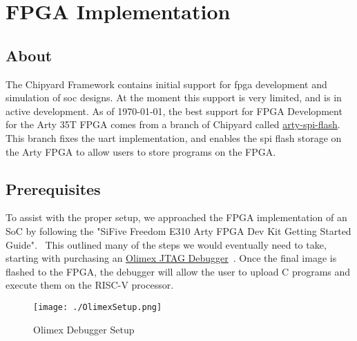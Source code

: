 \chapter{FPGA Implementation}\label{chap:FPGA_Implementation}

\section{About}\label{sec:About}
The Chipyard Framework contains initial support for \gls{fpga} development and simulation of \gls{soc} designs.
At the moment this support is very limited, and is in active development.
As of \today, the best support for FPGA Development for the Arty 35T FPGA comes from a branch of Chipyard called \href{https://github.com/ucb-bar/chipyard/tree/arty-spi-flash}{arty-spi-flash}.
This branch fixes the \gls{uart} implementation, and enables the \gls{spi} flash storage on the Arty FPGA to allow users to store programs on the FPGA.

\section{Prerequisites}\label{sec:Prerequisites}
To assist with the proper setup, we approached the FPGA implementation of an SoC by following the "SiFive Freedom E310 Arty FPGA Dev Kit Getting Started Guide".~\cite{FreedomDevGuide}
This outlined many of the steps we would eventually need to take, starting with purchasing an \href{https://www.digikey.com/en/products/detail/olimex-ltd/ARM-USB-TINY-H/3471388}{Olimex JTAG Debugger}~\cite{OlimexJTAG}. 
Once the final image is flashed to the FPGA, the debugger will allow the user to upload C programs and execute them on the RISC-V processor. 

\begin{figure}[h!tbp]
  \centering
  \texttt{[image: ./OlimexSetup.png]}
  \caption{Olimex Debugger Setup~\cite[p.~5]{FreedomDevGuide}}
  \label{fig:olimexsetup}
\end{figure}



